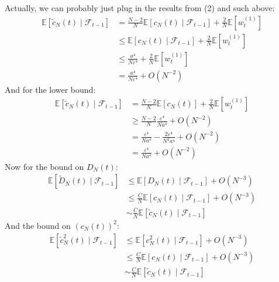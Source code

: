 \documentclass{article}
\newcommand{\E}{\mathbb{E}}
\newcommand{\wt}[2][t]{w_{#1}^{(#2)}}
\begin{document}
Actually, we can probably just plug in the results from (2) and such above:
\begin{align*}
\E[\tilde{c}_N(t)\mid \mathcal{F}_{t-1}] &= \frac{N-2}{N} \E[c_N(t)\mid \mathcal{F}_{t-1}] + \frac{2}{N} \E[\wt{1}] \\
& \leq \E[c_N(t)\mid \mathcal{F}_{t-1}] + \frac{2}{N} \E[\wt{1}] \\
&\leq \frac{a^4}{N\varepsilon^4} +  \frac{2}{N} \E[\wt{1}] \\
&= \frac{a^4}{N\varepsilon^4} + O(N^{-2})
\end{align*}
And for the lower bound:
\begin{align*}
\E[\tilde{c}_N(t)\mid \mathcal{F}_{t-1}] &= \frac{N-2}{N} \E[c_N(t)] + \frac{2}{N} \E[\wt{1}] \\
& \geq  \frac{N-2}{N}\frac{\varepsilon^4}{Na^4} + O(N^{-2}) \\
& = \frac{\varepsilon^4}{Na^4} - \frac{2\varepsilon^4}{N^2a^4} + O(N^{-2}) \\
& = \frac{\varepsilon^4}{Na^4} + O(N^{-2})
\end{align*}
Now for the bound on $D_N(t)$:
\begin{align*}
\E[\tilde{D}_N(t)\mid \mathcal{F}_{t-1}] &\leq \E[D_N(t)\mid \mathcal{F}_{t-1}] + O(N^{-3}) \\
&\leq \frac{C}{N} \E[c_N(t)\mid \mathcal{F}_{t-1}] + O(N^{-3}) \\
&\sim \frac{C}{N} \E[\tilde{c}_N(t)\mid \mathcal{F}_{t-1}]
\end{align*}
And the bound on $(c_N(t))^2$:
\begin{align*}
\E[\tilde{c}_N^2(t)\mid \mathcal{F}_{t-1}] &\leq \E[c_N^2(t)\mid \mathcal{F}_{t-1}] + O(N^{-3}) \\
&\leq \frac{C}{N} \E[c_N(t)\mid \mathcal{F}_{t-1}] + O(N^{-3}) \\
&\sim \frac{C}{N} \E[\tilde{c}_N(t)\mid \mathcal{F}_{t-1}]
\end{align*}


%
\end{document}
